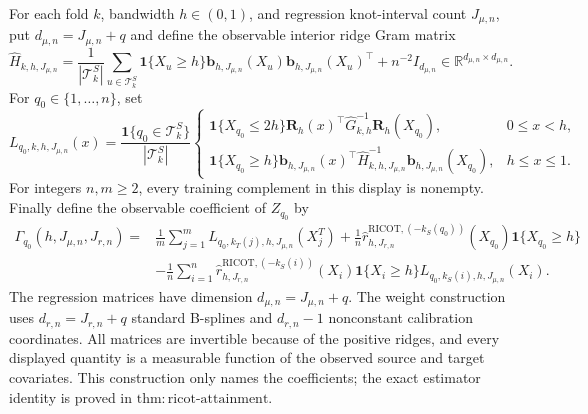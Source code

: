 For each fold \(k\), bandwidth \(h\in(0,1)\), and regression knot-interval count \(J_{\mu,n}\), put \(d_{\mu,n}=J_{\mu,n}+q\) and define the observable interior ridge Gram matrix
\[
\widehat H_{k,h,J_{\mu,n}}
=\frac1{|\mathcal T^S_k|}\sum_{u\in\mathcal T^S_k}\mathbf 1\{X_u\ge h\}
\mathbf b_{h,J_{\mu,n}}(X_u)\mathbf b_{h,J_{\mu,n}}(X_u)^\top+n^{-2}I_{d_{\mu,n}}
\in\mathbb R^{d_{\mu,n}\times d_{\mu,n}}.
\]
For \(q_0\in\{1,\ldots,n\}\), set
\[
L_{q_0,k,h,J_{\mu,n}}(x)=\frac{\mathbf 1\{q_0\in\mathcal T^S_k\}}{|\mathcal T^S_k|}
\begin{cases}
\mathbf 1\{X_{q_0}\le2h\}\mathbf R_h(x)^\top\widehat G_{k,h}^{-1}\mathbf R_h(X_{q_0}),&0\le x<h,\\
\mathbf 1\{X_{q_0}\ge h\}\mathbf b_{h,J_{\mu,n}}(x)^\top\widehat H_{k,h,J_{\mu,n}}^{-1}\mathbf b_{h,J_{\mu,n}}(X_{q_0}),&h\le x\le1.
\end{cases}
\]
For integers \(n,m\ge2\), every training complement in this display is nonempty. Finally define the observable coefficient of \(Z_{q_0}\) by
\[
\begin{aligned}
\Gamma_{q_0}(h,J_{\mu,n},J_{r,n})={}&
\frac1m\sum_{j=1}^mL_{q_0,k_T(j),h,J_{\mu,n}}(X_j^T)
+\frac1n\widehat r^{\mathrm{RICOT},(-k_S(q_0))}_{h,J_{r,n}}(X_{q_0})\mathbf 1\{X_{q_0}\ge h\}\\
&-\frac1n\sum_{i=1}^n
\widehat r^{\mathrm{RICOT},(-k_S(i))}_{h,J_{r,n}}(X_i)\mathbf 1\{X_i\ge h\}
L_{q_0,k_S(i),h,J_{\mu,n}}(X_i).
\end{aligned}
\]
The regression matrices have dimension \(d_{\mu,n}=J_{\mu,n}+q\). The weight construction uses \(d_{r,n}=J_{r,n}+q\) standard B-splines and \(d_{r,n}-1\) nonconstant calibration coordinates. All matrices are invertible because of the positive ridges, and every displayed quantity is a measurable function of the observed source and target covariates. This construction only names the coefficients; the exact estimator identity is proved in \(\mathrm{thm:ricot\text{-}attainment}\).